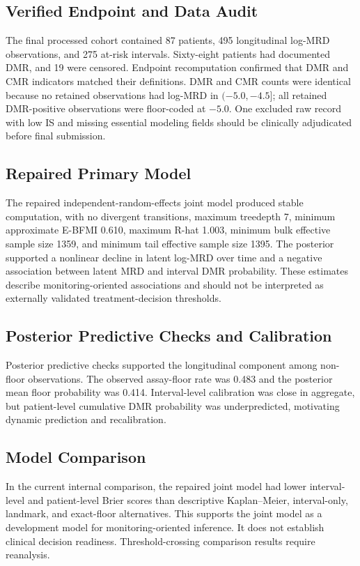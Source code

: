 \subsection{Verified Endpoint and Data Audit}

The final processed cohort contained 87 patients, 495 longitudinal log-MRD observations, and 275 at-risk intervals. Sixty-eight patients had documented DMR, and 19 were censored. Endpoint recomputation confirmed that DMR and CMR indicators matched their definitions. DMR and CMR counts were identical because no retained observations had log-MRD in \((-5.0,-4.5]\); all retained DMR-positive observations were floor-coded at \(-5.0\). One excluded raw record with low IS and missing essential modeling fields should be clinically adjudicated before final submission.

\subsection{Repaired Primary Model}

The repaired independent-random-effects joint model produced stable computation, with no divergent transitions, maximum treedepth 7, minimum approximate E-BFMI 0.610, maximum R-hat 1.003, minimum bulk effective sample size 1359, and minimum tail effective sample size 1395. The posterior supported a nonlinear decline in latent log-MRD over time and a negative association between latent MRD and interval DMR probability. These estimates describe monitoring-oriented associations and should not be interpreted as externally validated treatment-decision thresholds.

\subsection{Posterior Predictive Checks and Calibration}

Posterior predictive checks supported the longitudinal component among non-floor observations. The observed assay-floor rate was 0.483 and the posterior mean floor probability was 0.414. Interval-level calibration was close in aggregate, but patient-level cumulative DMR probability was underpredicted, motivating dynamic prediction and recalibration.

\subsection{Model Comparison}

In the current internal comparison, the repaired joint model had lower interval-level and patient-level Brier scores than descriptive Kaplan--Meier, interval-only, landmark, and exact-floor alternatives. This supports the joint model as a development model for monitoring-oriented inference. It does not establish clinical decision readiness. Threshold-crossing comparison results require reanalysis.

